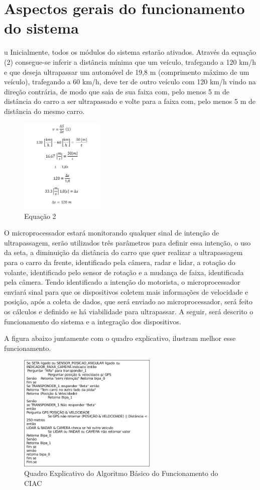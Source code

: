 \chapter[Aspectos gerais do funcionamento do sistema]{Aspectos gerais do funcionamento do sistema}
u
Inicialmente, todos os módulos do sistema estarão ativados. Através da equação (2) consegue-se inferir a distância mínima que um veículo, trafegando a 120 km/h e que deseja ultrapassar um automóvel de 19,8 m (comprimento máximo de um veículo), trafegando a 60 km/h, deve ter de outro veículo com 120 km/h vindo na direção contrária, de modo que saia de sua faixa com, pelo menos 5 m de distância do carro a ser ultrapassado e volte para a faixa com, pelo menos 5 m de distância do mesmo carro.

\begin{figure}[h]
  \centering
  \includegraphics[width=150px, scale=1]{figuras/formula_func}
  \caption{Equação 2}
\end{figure}

O microprocessador estará monitorando qualquer sinal de intenção de ultrapassagem, serão utilizados três parâmetros para definir essa intenção, o uso da seta, a diminuição da distância do carro que quer realizar a ultrapassagem para o carro da frente, identificado pela câmera, radar e lidar, a rotação do volante, identificado pelo sensor de rotação e a mudança de faixa, identificada pela câmera. Tendo identificado a intenção do motorista, o microprocessador enviará sinal para que os dispositivos coletem mais informações de velocidade e posição, após a coleta de dados, que será enviado ao microprocessador, será feito os cálculos e definido se há viabilidade para ultrapassar. A seguir, será descrito o funcionamento do sistema e a integração dos dispositivos.

A figura abaixo juntamente com o quadro explicativo, ilustram melhor esse funcionamento.

\begin{figure}[h]
  \centering
  \includegraphics[width=250px, scale=1]{figuras/quadro_explicativo}
  \caption{Quadro Explicativo do Algoritmo Básico do Funcionamento do CIAC}
\end{figure}

